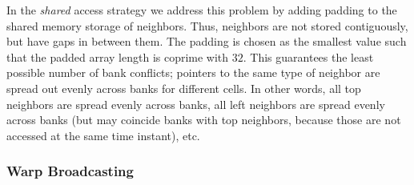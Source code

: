 In the \emph{shared} access strategy we address this problem by adding padding to the shared memory storage of neighbors. Thus, neighbors are not stored contiguously, but have gaps in between them. The padding is chosen as the smallest value such that the padded array length is coprime with $32$. This guarantees the least possible number of bank conflicts; pointers to the same type of neighbor are spread out evenly across banks for different cells. In other words, all top neighbors are spread evenly across banks, all left neighbors are spread evenly across banks (but may coincide banks with top neighbors, because those are not accessed at the same time instant), etc.

\subsubsection{Warp Broadcasting}

